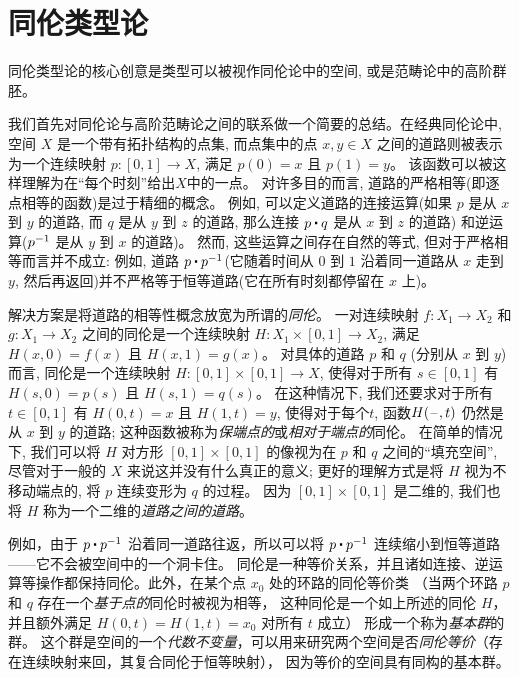 \chapter{同伦类型论}
\label{cha:basics}

同伦类型论的核心创意是类型可以被视作同伦论中的空间, 或是范畴论中的高阶群胚。

我们首先对同伦论与高阶范畴论之间的联系做一个简要的总结。在经典同伦论中, 空间 $X$ 是一个带有拓扑结构的点集,
而点集中的点 $x,y \in X$ 之间的道路则被表示为一个连续映射 $p : [0,1] \to X$, 满足 $p(0) = x$ 且 $p(1) = y$。
该函数可以被这样理解为在``每个时刻''给出$X$中的一点。 对许多目的而言, 道路的严格相等(即逐点相等的函数)是过于精细的概念。
例如, 可以定义道路的连接运算(如果 $p$ 是从 $x$ 到 $y$ 的道路, 而 $q$ 是从 $y$ 到 $z$ 的道路, 那么连接 $p \ct q$ 是从 $x$ 到 $z$ 的道路)
和逆运算($\mathord{{p}^{-1}}$ 是从 $y$ 到 $x$ 的道路)。 然而, 这些运算之间存在自然的等式, 但对于严格相等而言并不成立: 
例如, 道路 $p \ct \opp p$(它随着时间从 $0$ 到 $1$ 沿着同一道路从 $x$ 走到 $y$, 然后再返回)并不严格等于恒等道路(它在所有时刻都停留在 $x$ 上)。

解决方案是将道路的相等性概念放宽为所谓的\emph{同伦}。
一对连续映射 $f : X_1 \to X_2$ 和 $g : X_1\to X_2$ 之间的同伦是一个连续映射 $H : X_1 \times [0, 1] \to X_2$, 满足 $H(x, 0) = f (x)$ 且 $H(x, 1) = g(x)$。
对具体的道路 $p$ 和 $q$ (分别从 $x$ 到 $y$) 而言, 同伦是一个连续映射 $H : [0,1] \times [0,1] \rightarrow X$, 
使得对于所有 $s\in [0,1]$ 有 $H(s,0) = p(s)$ 且 $H(s,1) = q(s)$。
在这种情况下, 我们还要求对于所有 $t\in [0,1]$ 有 $H(0,t) = x$ 且 $H(1,t)=y$, 使得对于每个$t$, 
函数$H(\mathord{\hspace{1pt}\text{--}\hspace{1pt}},t)$ 仍然是从 $x$ 到 $y$ 的道路; 这种函数被称为\emph{保端点的}或\emph{相对于端点的}同伦。
在简单的情况下, 我们可以将 $H$ 对方形 $[0,1]\times [0,1]$ 的像视为在 $p$ 和 $q$ 之间的``填充空间'',
尽管对于一般的 $X$ 来说这并没有什么真正的意义; 更好的理解方式是将 $H$ 视为不移动端点的, 将 $p$ 连续变形为 $q$ 的过程。
因为 $[0,1]\times [0,1]$ 是二维的, 我们也将 $H$ 称为一个二维的\emph{道路之间的道路}。

例如，由于 $p \ct \opp p$ 沿着同一道路往返，所以可以将 $p \ct \opp p$ 连续缩小到恒等道路——它不会被空间中的一个洞卡住。
同伦是一种等价关系，并且诸如连接、逆运算等操作都保持同伦。此外，在某个点 $x_0$ 处的环路的同伦等价类
（当两个环路 $p$ 和 $q$ 存在一个\emph{基于点的}同伦时被视为相等，
这种同伦是一个如上所述的同伦 $H$，并且额外满足 $H(0,t) = H(1,t) = x_0$ 对所有 $t$ 成立）
形成一个称为\emph{基本群}的群。
这个群是空间的一个\emph{代数不变量}，可以用来研究两个空间是否\emph{同伦等价}（存在连续映射来回，其复合同伦于恒等映射），
因为等价的空间具有同构的基本群。

